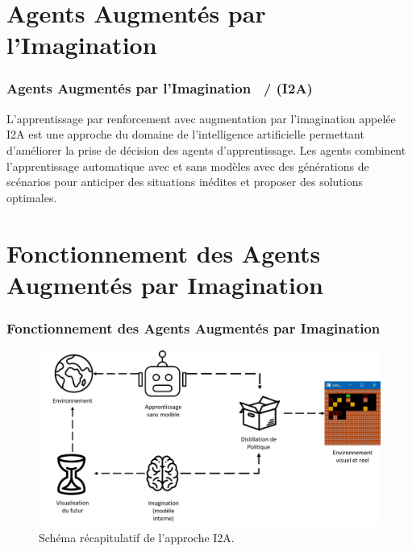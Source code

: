 \documentclass[
	11pt, %
]{beamer}
\begin{document}
\section{Agents Augmentés par l'Imagination}

\begin{frame}
	\frametitle{Agents Augmentés par l'Imagination \ / (I2A)}
	
	\smallskip %

	\begin{definition}
	\alert{L'apprentissage par renforcement avec augmentation par l'imagination} appelée \alert{I2A} est une approche du domaine de l'intelligence artificielle permettant d'améliorer la prise de décision des agents d'apprentissage.
	Les agents combinent l'apprentissage automatique avec et sans modèles avec des générations de scénarios pour anticiper des situations inédites et proposer des solutions optimales.
	\end{definition}
	
	\smallskip %

\end{frame}

\section{Fonctionnement des Agents Augmentés par Imagination}

\begin{frame}
	\frametitle{Fonctionnement des Agents Augmentés par Imagination}
	
	\smallskip %

	\begin{figure}
		\centering
		\includegraphics[width=1.0\linewidth]{Images/schema_i2a.png}
		\caption{Schéma récapitulatif de l'approche I2A.}
	\end{figure}
	
	\smallskip %

\end{frame}
\end{document}
